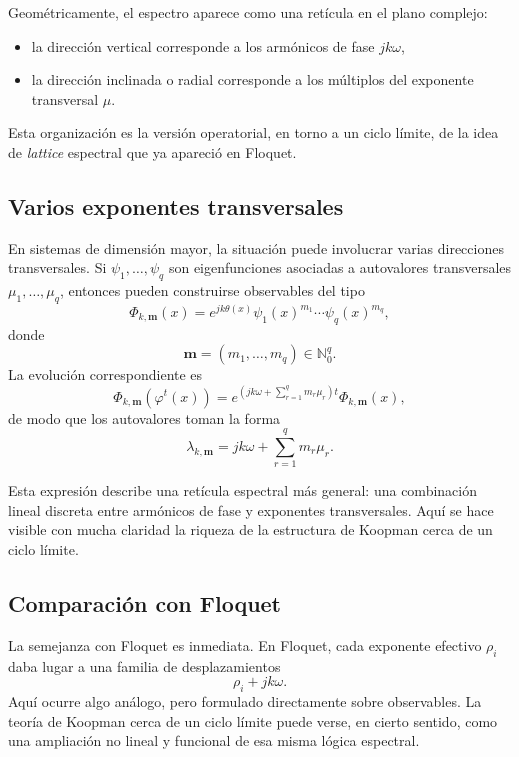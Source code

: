 Geométricamente, el espectro aparece como una retícula en el plano complejo:
\begin{itemize}
\item la dirección vertical corresponde a los armónicos de fase \(jk\omega\),
\item la dirección inclinada o radial corresponde a los múltiplos del exponente transversal \(\mu\).
\end{itemize}
Esta organización es la versión operatorial, en torno a un ciclo límite, de la idea de \emph{lattice} espectral que ya apareció en Floquet.

\subsection{Varios exponentes transversales}

En sistemas de dimensión mayor, la situación puede involucrar varias direcciones transversales. Si \(\psi_1,\dots,\psi_q\) son eigenfunciones asociadas a autovalores transversales \(\mu_1,\dots,\mu_q\), entonces pueden construirse observables del tipo
\begin{equation}
\Phi_{k,\mathbf{m}}(x)
=
e^{jk\theta(x)}
\psi_1(x)^{m_1}\cdots \psi_q(x)^{m_q},
\label{eq:Koopman_ladder_multiobservable}
\end{equation}
donde
\[
\mathbf{m}=(m_1,\dots,m_q)\in\mathbb{N}_0^q.
\]
La evolución correspondiente es
\begin{equation}
\Phi_{k,\mathbf{m}}(\varphi^t(x))
=
e^{\left(jk\omega+\sum_{r=1}^{q}m_r\mu_r\right)t}
\Phi_{k,\mathbf{m}}(x),
\label{eq:Koopman_ladder_multievolution}
\end{equation}
de modo que los autovalores toman la forma
\begin{equation}
\lambda_{k,\mathbf{m}}
=
jk\omega+\sum_{r=1}^{q}m_r\mu_r.
\label{eq:Koopman_ladder_multispectrum}
\end{equation}

Esta expresión describe una retícula espectral más general: una combinación lineal discreta entre armónicos de fase y exponentes transversales. Aquí se hace visible con mucha claridad la riqueza de la estructura de Koopman cerca de un ciclo límite.

\subsection{Comparación con Floquet}

La semejanza con Floquet es inmediata. En Floquet, cada exponente efectivo \(\rho_i\) daba lugar a una familia de desplazamientos
\[
\rho_i+jk\omega.
\]
Aquí ocurre algo análogo, pero formulado directamente sobre observables. La teoría de Koopman cerca de un ciclo límite puede verse, en cierto sentido, como una ampliación no lineal y funcional de esa misma lógica espectral.

